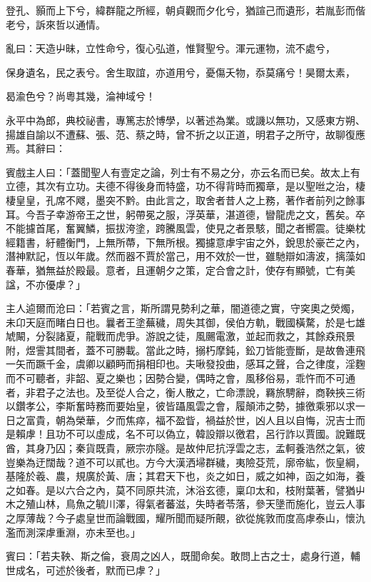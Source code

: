 \begin{pinyinscope}
登孔、顥而上下兮，緯群龍之所經，朝貞觀而夕化兮，猶諠己而遺形，若胤彭而偕老兮，訴來哲以通情。

亂曰：天造屮昧，立性命兮，復心弘道，惟賢聖兮。渾元運物，流不處兮，

保身遺名，民之表兮。舍生取誼，亦道用兮，憂傷夭物，忝莫痛兮！昊爾太素，

曷渝色兮？尚粵其幾，淪神域兮！

永平中為郎，典校祕書，專篤志於博學，以著述為業。或譏以無功，又感東方朔、揚雄自諭以不遭蘇、張、范、蔡之時，曾不折之以正道，明君子之所守，故聊復應焉。其辭曰：

賓戲主人曰：「蓋聞聖人有壹定之論，列士有不易之分，亦云名而已矣。故太上有立德，其次有立功。夫德不得後身而特盛，功不得背時而獨章，是以聖咝之治，棲棲皇皇，孔席不飕，墨突不黔。由此言之，取舍者昔人之上務，著作者前列之餘事耳。今吾子幸游帝王之世，躬帶冕之服，浮英華，湛道德，矕龍虎之文，舊矣。卒不能攄首尾，奮翼鱗，振拔洿塗，跨騰風雲，使見之者景駭，聞之者嚮震。徒樂枕經籍書，紆體衡門，上無所蔕，下無所根。獨攄意虖宇宙之外，銳思於豪芒之內，潛神默記，恆以年歲。然而器不賈於當己，用不效於一世，雖馳辯如濤波，摛藻如春華，猶無益於殿最。意者，且運朝夕之策，定合會之計，使存有顯號，亡有美諡，不亦優虖？」

主人逌爾而沧曰：「若賓之言，斯所謂見勢利之華，闇道德之實，守穾奧之熒燭，未卬天庭而睹白日也。曩者王塗蕪穢，周失其御，侯伯方軌，戰國橫騖，於是七雄虓闞，分裂諸夏，龍戰而虎爭。游說之徒，風颺電激，並起而救之，其餘猋飛景附，煜霅其間者，蓋不可勝載。當此之時，搦朽摩鈍，鈆刀皆能壹斷，是故魯連飛一矢而蹶千金，虞卿以顧眄而捐相印也。夫啾發投曲，感耳之聲，合之律度，淫麴而不可聽者，非韶、夏之樂也；因勢合變，偶時之會，風移俗易，乖忤而不可通者，非君子之法也。及至從人合之，衡人散之，亡命漂說，羇旅騁辭，商鞅挾三術以鑽孝公，李斯奮時務而要始皇，彼皆躡風雲之會，履顛沛之勢，據徼乘邪以求一日之富貴，朝為榮華，夕而焦瘁，福不盈眥，禍益於世，凶人且以自悔，況吉士而是賴虖！且功不可以虛成，名不可以偽立，韓設辯以徼君，呂行詐以賈國。說難既酋，其身乃囚；秦貨既貴，厥宗亦隧。是故仲尼抗浮雲之志，孟軻養浩然之氣，彼豈樂為迂闊哉？道不可以貳也。方今大漢洒埽群穢，夷險芟荒，廓帝紘，恢皇綱，基隆於羲、農，規廣於黃、唐；其君天下也，炎之如日，威之如神，函之如海，養之如春。是以六合之內，莫不同原共流，沐浴玄德，稟卬太和，枝附葉著，譬猶屮木之殖山林，鳥魚之毓川澤，得氣者蕃滋，失時者苓落，參天墬而施化，豈云人事之厚薄哉？今子處皇世而論戰國，耀所聞而疑所覿，欲從旄敦而度高虖泰山，懷氿濫而測深虖重淵，亦未至也。」

賓曰：「若夫鞅、斯之倫，衰周之凶人，既聞命矣。敢問上古之士，處身行道，輔世成名，可述於後者，默而已虖？」


\end{pinyinscope}
